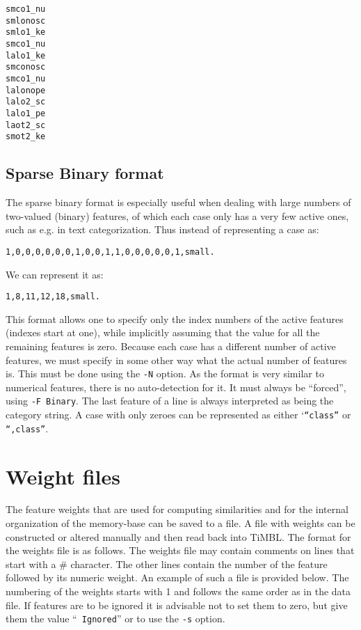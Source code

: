 \documentclass{report}
\begin{document}
\begin{verbatim}
smco1_nu
smlonosc
smlo1_ke
smco1_nu
lalo1_ke
smconosc
smco1_nu
lalonope
lalo2_sc
lalo1_pe
laot2_sc
smot2_ke
\end{verbatim}

\subsection{Sparse Binary format}
\label{binaryformat}

The sparse binary format is especially useful when dealing with large
numbers of two-valued (binary) features, of which each case only has a
very few active ones, such as e.g. in text categorization. Thus
instead of representing a case as:

\begin{verbatim}
1,0,0,0,0,0,0,1,0,0,1,1,0,0,0,0,0,1,small.
\end{verbatim}

We can represent it as:

\begin{verbatim}
1,8,11,12,18,small.
\end{verbatim}

This format allows one to specify only the index numbers of the active
features (indexes start at one), while implicitly assuming that
the value for all the remaining features is zero. Because each case
has a different number of active features, we must specify in some
other way what the actual number of features is. This must be done
using the {\tt -N} option.  As the format is very similar to numerical
features, there is no auto-detection for it. It must always be
``forced'', using {\tt -F Binary}. The last feature of a line is
always interpreted as being the category string. A case with only
zeroes can be represented as either `{\tt ``class''} or {\tt ``,class''}.

\section{Weight files}
\label{weightformat}

The feature weights that are used for computing similarities and for
the internal organization of the memory-base can be saved to a file.
A file with weights can be constructed or altered manually and then
read back into TiMBL. The format for the weights file is as follows.
The weights file may contain comments on lines that start with a \#
character. The other lines contain the number of the feature followed
by its numeric weight. An example of such a file is provided
below. The numbering of the weights starts with 1 and follows the same
order as in the data file. If features are to be ignored it is
advisable not to set them to zero, but give them the value ``{\tt
Ignored}'' or to use the {\tt -s} option.
\end{document}
